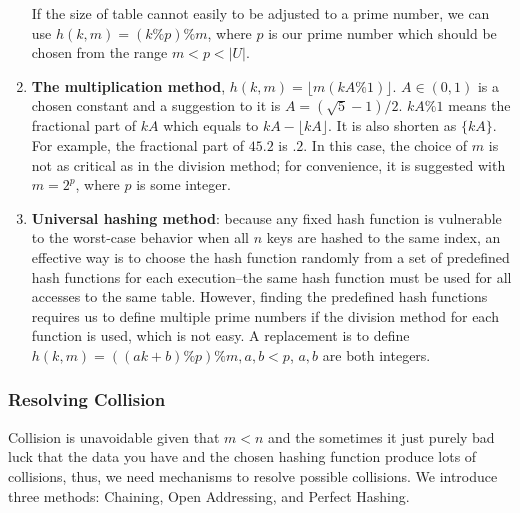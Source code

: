 \documentclass[../main.tex]{subfiles}
\begin{document}
\begin{enumerate}
    If the size of table cannot easily to be adjusted to a prime number, we can use $h(k, m) = (k \% p) \% m$, where $p$ is our prime number which should be chosen from the range $m<p<|U|$.
    \item \textbf{The multiplication method}, $h(k, m)=\lfloor m(kA \% 1)\rfloor$. $A \in (0, 1)$ is a chosen constant and a suggestion to it is $A=(\sqrt{5}-1)/2$. $kA \% 1$ means the fractional part of $kA$  which equals to $kA-\lfloor kA \rfloor$. It is also shorten as $\{kA\}$. For example, the fractional part of $45.2$  is $.2$. In this case, the choice of $m$ is not as critical as in the division method; for convenience, it is suggested with $m=2^p$, where $p$ is some integer. 
    \item \textbf{Universal hashing method}: because any fixed hash function is vulnerable to the worst-case behavior when all $n$ keys are hashed to the same index, an effective way is to choose the hash function randomly from a set of predefined hash functions for each execution--the same hash function must be used for all accesses to the same table. However, finding the predefined hash functions requires us to define multiple prime numbers if the division method for each function is used, which is not easy. A replacement is to define $h(k, m) = ((ak+b) \% p) \% m, a, b<p$, $a,b$ are both integers.
\end{enumerate}

\subsubsection{Resolving Collision}
Collision is unavoidable given that $m<n$ and the sometimes it just purely bad luck that the data you have and the chosen hashing function produce lots of collisions, thus, we need mechanisms to resolve possible collisions. We introduce three methods: Chaining, Open Addressing, and Perfect Hashing.
\end{document}
